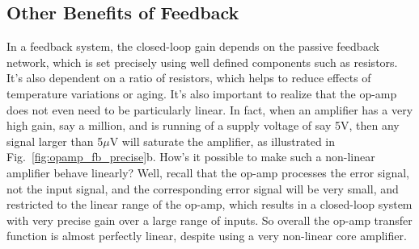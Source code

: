 \subsection{Other Benefits of Feedback}
In a feedback system, the closed-loop gain depends on the passive feedback network, which is set precisely using well defined components such as resistors.  It's also dependent on a ratio of resistors, which helps to reduce effects of temperature variations or aging.  It's also important to realize that the op-amp does not even need to be particularly linear.  In fact, when an amplifier has a very high gain, say a million, and is running of a supply voltage of say 5V, then any signal larger than 5$\mu$V will saturate the amplifier, as illustrated in Fig.~\ref{fig:opamp_fb_precise}b.  How's it possible to make such a non-linear amplifier behave linearly?  Well, recall that the op-amp processes the error signal, not the input signal, and the corresponding error signal will be very small, and restricted to the linear range of the op-amp, which results in a closed-loop system with very precise gain over a large range of inputs.  So overall the op-amp transfer function is almost perfectly linear, despite using a very non-linear core amplifier. 

